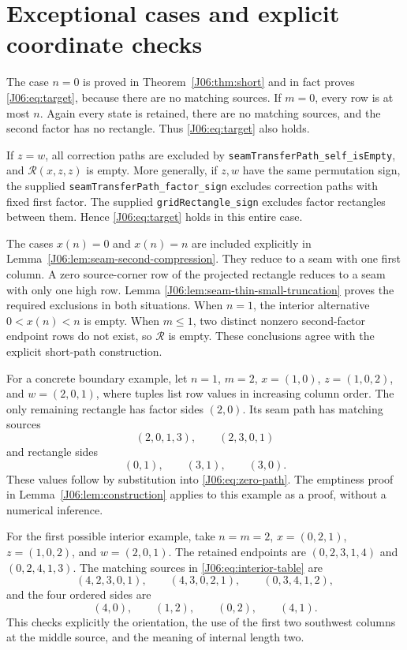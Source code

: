 \documentclass[11pt,oneside]{report}
\theoremstyle{definition}
\numberwithin{equation}{section}
\newcommand{\decl}[1]{\textnormal{\nolinkurl{#1}}}
\newcommand{\cR}{\mathcal R}
\begin{document}
\section{Exceptional cases and explicit coordinate checks}

The case $n=0$ is proved in Theorem~\ref{J06:thm:short} and in fact proves
\eqref{J06:eq:target}, because there are no matching sources.
If $m=0$, every row is at most $n$. Again every state is retained,
there are no matching sources, and the second factor has no rectangle.
Thus \eqref{J06:eq:target} also holds.

If $z=w$, all correction paths are excluded by
\decl{seamTransferPath_self_isEmpty}, and $\cR(x,z,z)$ is empty.
More generally, if $z,w$ have the same permutation sign, the supplied
\decl{seamTransferPath_factor_sign} excludes correction paths with
fixed first factor. The supplied \decl{gridRectangle_sign} excludes
factor rectangles between them. Hence \eqref{J06:eq:target} holds in
this entire case.

The cases $x(n)=0$ and $x(n)=n$ are included explicitly in
Lemma~\ref{J06:lem:seam-second-compression}. They reduce to a seam with
one first column. A zero source-corner row of the projected rectangle
reduces to a seam with only one high row. Lemma
\ref{J06:lem:seam-thin-small-truncation} proves the required exclusions in
both situations. When $n=1$, the interior alternative $0<x(n)<n$ is
empty. When $m\le1$, two distinct nonzero second-factor endpoint rows
do not exist, so $\cR$ is empty. These conclusions agree with the
explicit short-path construction.

For a concrete boundary example, let $n=1$, $m=2$,
$x=(1,0)$, $z=(1,0,2)$, and $w=(2,0,1)$, where tuples list row
values in increasing column order. The only remaining rectangle has
factor sides $(2,0)$. Its seam path has matching sources
\[
 (2,0,1,3),\qquad(2,3,0,1)
\]
and rectangle sides
\[
 (0,1),\qquad(3,1),\qquad(3,0).
\]
These values follow by substitution into \eqref{J06:eq:zero-path}.
The emptiness proof in Lemma~\ref{J06:lem:construction} applies to this
example as a proof, without a numerical inference.

For the first possible interior example, take $n=m=2$,
$x=(0,2,1)$, $z=(1,0,2)$, and $w=(2,0,1)$.
The retained endpoints are $(0,2,3,1,4)$ and $(0,2,4,1,3)$.
The matching sources in \eqref{J06:eq:interior-table} are
\[
 (4,2,3,0,1),\qquad(4,3,0,2,1),\qquad(0,3,4,1,2),
\]
and the four ordered sides are
\[
 (4,0),\qquad(1,2),\qquad(0,2),\qquad(4,1).
\]
This checks explicitly the orientation, the use of the first two
southwest columns at the middle source, and the meaning of internal
length two.
\end{document}
